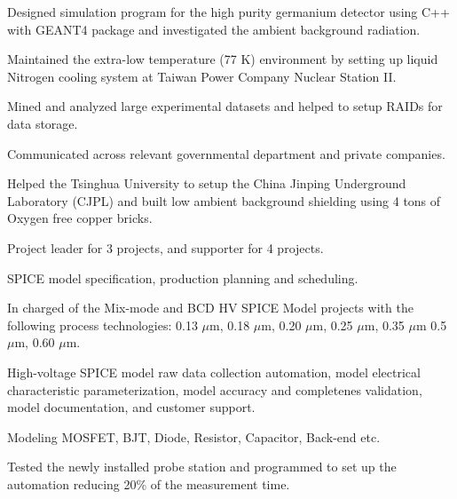 \documentclass[letterpaper]{deedy-resume-openfont}
\begin{document}
\begin{tightemize}
\item Designed simulation program for the high purity germanium detector using C++ with GEANT4 package and investigated the ambient background radiation.
\item Maintained the extra-low temperature (77 K) environment by setting up liquid Nitrogen cooling system at Taiwan Power Company Nuclear Station II.
\item Mined and analyzed large experimental datasets and helped to setup RAIDs for data storage.
\item Communicated across relevant governmental department and private companies.
\item Helped the Tsinghua University to setup the China Jinping Underground Laboratory (CJPL) and built low ambient background shielding using 4 tons of Oxygen free copper bricks.
\end{tightemize}
\sectionsep

\begin{tightemize}
\item Project leader for 3 projects, and supporter for 4 projects.
\item SPICE model specification, production planning and scheduling.
\item In charged of the Mix-mode and BCD HV SPICE Model projects with the following process technologies: 0.13 $\mu$m, 0.18 $\mu$m, 0.20 $\mu$m, 0.25 $\mu$m, 0.35 $\mu$m 0.5 $\mu$m, 0.60 $\mu$m.
\item High-voltage SPICE model raw data collection automation, model electrical characteristic parameterization, model accuracy and completenes validation, model documentation, and customer support.
\item Modeling MOSFET, BJT, Diode, Resistor, Capacitor, Back-end etc.
\item Tested the newly installed probe station and programmed to set up the automation reducing 20\% of the measurement time.
\end{tightemize}
\sectionsep
\end{document}
